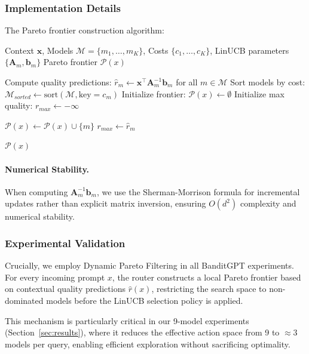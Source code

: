 \subsubsection{Implementation Details}

The Pareto frontier construction algorithm:

\begin{algorithm}[t]
\caption{Dynamic Pareto Filtering}
\label{alg:pareto_filtering}
\begin{algorithmic}[1]
\Require Context $\mathbf{x}$, Models $\mathcal{M} = \{m_1, \ldots, m_K\}$, Costs $\{c_1, \ldots, c_K\}$, LinUCB parameters $\{\mathbf{A}_m, \mathbf{b}_m\}$
\Ensure Pareto frontier $\mathcal{P}(x)$

\State Compute quality predictions: $\hat{r}_m \gets \mathbf{x}^\top \mathbf{A}_m^{-1} \mathbf{b}_m$ for all $m \in \mathcal{M}$
\State Sort models by cost: $\mathcal{M}_{sorted} \gets \text{sort}(\mathcal{M}, \text{key}=c_m)$
\State Initialize frontier: $\mathcal{P}(x) \gets \emptyset$
\State Initialize max quality: $r_{max} \gets -\infty$

 
     
        \State $\mathcal{P}(x) \gets \mathcal{P}(x) \cup \{m\}$
        \State $r_{max} \gets \hat{r}_m$
    \EndIf
\EndFor

\State \Return $\mathcal{P}(x)$
\end{algorithmic}
\end{algorithm}

\paragraph{Numerical Stability.}
When computing $\mathbf{A}_m^{-1} \mathbf{b}_m$, we use the Sherman-Morrison formula for incremental updates rather than explicit matrix inversion, ensuring $O(d^2)$ complexity and numerical stability.

\subsubsection{Experimental Validation}

Crucially, we employ Dynamic Pareto Filtering in all BanditGPT experiments. For every incoming prompt $x$, the router constructs a local Pareto frontier based on contextual quality predictions $\hat{r}(x)$, restricting the search space to non-dominated models before the LinUCB selection policy is applied.

This mechanism is particularly critical in our 9-model experiments (Section~\ref{sec:results}), where it reduces the effective action space from 9 to $\approx$3 models per query, enabling efficient exploration without sacrificing optimality.

